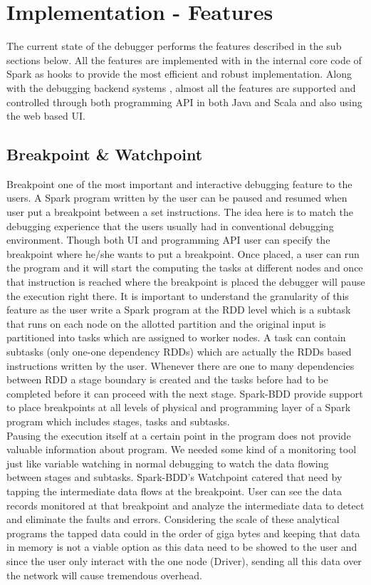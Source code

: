 \documentclass{acm_proc_article-sp}
\begin{document}
\section{Implementation - Features}
The current state of the debugger performs the features described in the sub sections below. All the features are implemented with in the internal core code of Spark as hooks to provide the most efficient and robust implementation. Along with the debugging backend systems , almost all the features are supported and controlled through both programming API in both Java and Scala and also using the web based UI.


\subsection{Breakpoint \& Watchpoint}
Breakpoint one of the most important and interactive debugging feature to the users. A Spark program written by the user can be paused and resumed when user put a breakpoint between a set instructions. The idea here is to match the debugging experience that the users usually had in conventional debugging environment. Though both UI and programming API user can specify the breakpoint where he/she wants to put a breakpoint. Once placed, a user can run the program and it will start the computing the tasks at different nodes and once that instruction is reached where the breakpoint is placed the debugger will pause the execution right there. It is important to understand the granularity of this feature as the user write a Spark program at the RDD level which is a subtask that runs on each node on the allotted partition and the original input is partitioned into tasks which are assigned to worker nodes. A task can contain subtasks (only one-one dependency RDDs) which are actually the RDDs based instructions written by the user. Whenever there are one to many dependencies between RDD a stage boundary is created and the tasks before had to be completed before it can proceed with the next stage. Spark-BDD provide support to place breakpoints at all levels of physical and programming layer of a Spark program which includes stages, tasks and subtasks.\\
Pausing the execution itself at a certain point in the program does not provide valuable information about program. We needed some kind of a monitoring tool just like variable watching in normal debugging to watch the data flowing between stages and subtasks. Spark-BDD's Watchpoint catered that need by tapping the intermediate data flows at the breakpoint. User can see the data records monitored at that breakpoint and analyze the intermediate data to detect and eliminate the faults and errors. Considering the scale of these analytical programs the tapped data could in the order of giga bytes and keeping that data in memory is not a viable option as this data need to be showed to the user and since the user only interact with the one node (Driver), sending all this data over the network will cause tremendous overhead. \\
\end{document}
